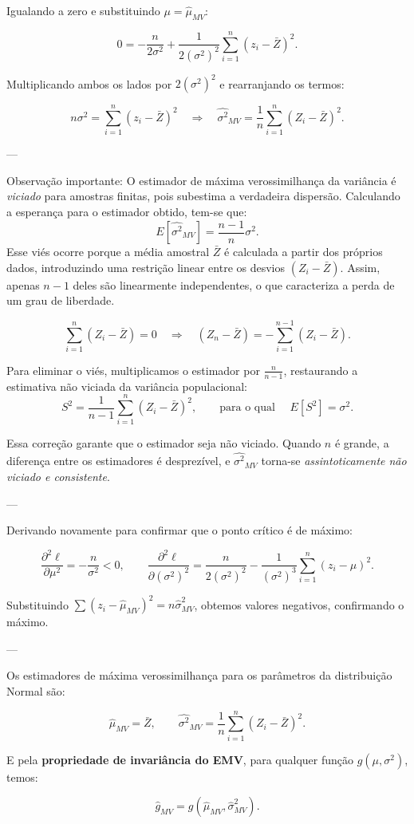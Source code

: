 Igualando a zero e substituindo $\mu = \widehat{\mu}_{MV}$:

\[
0 = -\frac{n}{2\sigma^2}
+ \frac{1}{2(\sigma^2)^2}\sum_{i=1}^n (z_i-\bar{Z})^2.
\]

Multiplicando ambos os lados por $2(\sigma^2)^2$ e rearranjando os termos:

\[
n\sigma^2 = \sum_{i=1}^n (z_i-\bar{Z})^2
\quad\Longrightarrow\quad
\boxed{
\widehat{\sigma^2}_{MV} = \frac{1}{n}\sum_{i=1}^n (Z_i - \bar{Z})^2.
}
\]

---

\noindent
Observação importante: O estimador de máxima verossimilhança da variância é \textit{viciado} para amostras finitas, pois subestima a verdadeira dispersão.  
Calculando a esperança para o estimador obtido, tem-se que:
\[
E[\widehat{\sigma^2}_{MV}] = \frac{n-1}{n}\sigma^2.
\]
Esse viés ocorre porque a média amostral $\bar{Z}$ é calculada a partir dos próprios dados, introduzindo uma restrição linear entre os desvios $(Z_i - \bar{Z})$.  
Assim, apenas $n - 1$ deles são linearmente independentes, o que caracteriza a perda de um grau de liberdade.

\[
\sum_{i=1}^{n}(Z_i - \bar{Z}) = 0 \quad \Longrightarrow \quad (Z_n - \bar{Z}) = -\sum_{i=1}^{n-1}(Z_i - \bar{Z}).
\]

Para eliminar o viés, multiplicamos o estimador por $\tfrac{n}{n-1}$,  
restaurando a estimativa não viciada da variância populacional:
\[
S^2 = \frac{1}{n-1}\sum_{i=1}^{n}(Z_i - \bar{Z})^2, 
\qquad \text{para o qual } \quad E[S^2] = \sigma^2.
\]

Essa correção garante que o estimador seja não viciado.  
Quando $n$ é grande, a diferença entre os estimadores é desprezível,  
e $\widehat{\sigma^2}_{MV}$ torna-se \textit{assintoticamente não viciado e consistente}.

---

Derivando novamente para confirmar que o ponto crítico é de máximo:

\[
\frac{\partial^2 \ell}{\partial \mu^2} = -\frac{n}{\sigma^2} < 0,
\qquad
\frac{\partial^2 \ell}{\partial(\sigma^2)^2}
= \frac{n}{2(\sigma^2)^2} - \frac{1}{(\sigma^2)^3}\sum_{i=1}^n (z_i-\mu)^2.
\]

Substituindo $\sum (z_i-\widehat\mu_{MV})^2 = n\widehat\sigma^2_{MV}$, obtemos valores negativos, confirmando o máximo.

---
 
Os estimadores de máxima verossimilhança para os parâmetros da distribuição Normal são:

\[
\boxed{
\widehat\mu_{MV} = \bar{Z},
\qquad
\widehat{\sigma^2}_{MV} = \frac{1}{n}\sum_{i=1}^n (Z_i - \bar{Z})^2.
}
\]

E pela \textbf{propriedade de invariância do EMV}, para qualquer função $g(\mu,\sigma^2)$, temos:

\[
\boxed{
\widehat{g}_{MV} = g(\widehat\mu_{MV}, \widehat\sigma^2_{MV}).
}
\]